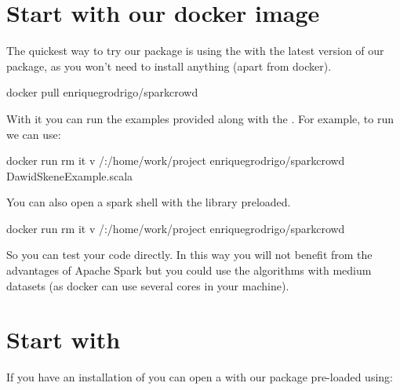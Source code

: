\documentclass[letterpaper,10pt,english]{sphinxmanual}
\begin{document}
\section{Start with our docker image}
\label{\detokenize{usage/quickstart:start-with-our-docker-image}}
The quickest way to try our package is using the
 with the latest version of
our package, as you won’t need to install anything (apart from docker).

%
\begin{sphinxVerbatim}[commandchars=\\\{\}]
docker pull enriquegrodrigo/spark\PYGZhy{}crowd
\end{sphinxVerbatim}

With it you can run the examples provided along with the
. For example,
to run  we can use:

%
\begin{sphinxVerbatim}[commandchars=\\\{\}]
docker run \PYGZhy{}\PYGZhy{}rm \PYGZhy{}it \PYGZhy{}v /:/home/work/project enriquegrodrigo/spark\PYGZhy{}crowd DawidSkeneExample.scala
\end{sphinxVerbatim}

You can also open a spark shell with the library preloaded.

%
\begin{sphinxVerbatim}[commandchars=\\\{\}]
docker run \PYGZhy{}\PYGZhy{}rm \PYGZhy{}it \PYGZhy{}v /:/home/work/project enriquegrodrigo/spark\PYGZhy{}crowd
\end{sphinxVerbatim}

So you can test your code directly. In this way you will not benefit from the advantages of Apache Spark
but you could use the algorithms with medium datasets (as docker can use several cores in your machine).


\section{Start with }
\label{\detokenize{usage/quickstart:start-with-spark-packages}}
If you have an installation of   you can open a  with
our package pre-loaded using:
\end{document}

